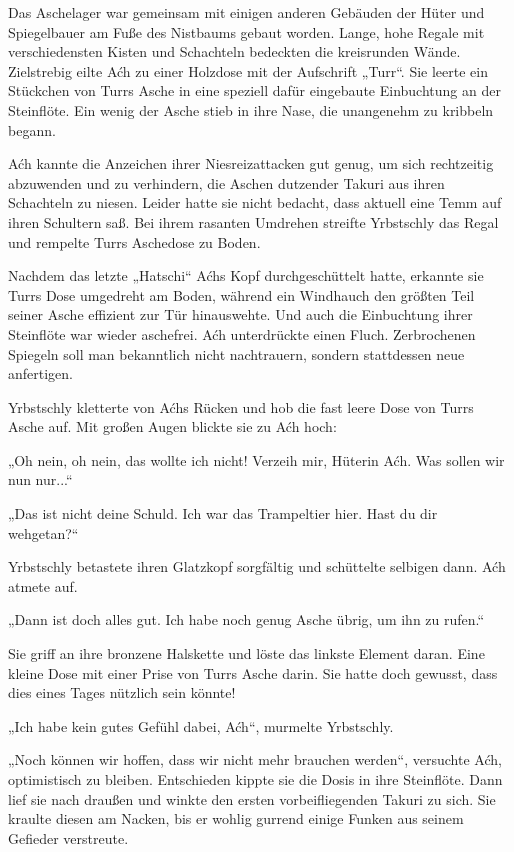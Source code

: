 Das Aschelager war gemeinsam mit einigen anderen Gebäuden der Hüter und Spiegelbauer am Fuße des Nistbaums gebaut worden. Lange, hohe Regale mit verschiedensten Kisten und Schachteln bedeckten die kreisrunden Wände. Zielstrebig eilte Aćh zu einer Holzdose mit der Aufschrift „Turr“. Sie leerte ein Stückchen von Turrs Asche in eine speziell dafür eingebaute Einbuchtung an der Steinflöte. Ein wenig der Asche stieb in ihre Nase, die unangenehm zu kribbeln begann.

Aćh kannte die Anzeichen ihrer Niesreizattacken gut genug, um sich rechtzeitig abzuwenden und zu verhindern, die Aschen dutzender Takuri aus ihren Schachteln zu niesen. Leider hatte sie nicht bedacht, dass aktuell eine Temm auf ihren Schultern saß. Bei ihrem rasanten Umdrehen streifte Yrbstschly das Regal und rempelte Turrs Aschedose zu Boden.

Nachdem das letzte „Hatschi“ Aćhs Kopf durchgeschüttelt hatte, erkannte sie Turrs Dose umgedreht am Boden, während ein Windhauch den größten Teil seiner Asche effizient zur Tür hinauswehte. Und auch die Einbuchtung ihrer Steinflöte war wieder aschefrei. Aćh unterdrückte einen Fluch. Zerbrochenen Spiegeln soll man bekanntlich nicht nachtrauern, sondern stattdessen neue anfertigen.

Yrbstschly kletterte von Aćhs Rücken und hob die fast leere Dose von Turrs Asche auf. Mit großen Augen blickte sie zu Aćh hoch:

„Oh nein, oh nein, das wollte ich nicht! Verzeih mir, Hüterin Aćh. Was sollen wir nun nur...“

„Das ist nicht deine Schuld. Ich war das Trampeltier hier. Hast du dir wehgetan?“

Yrbstschly betastete ihren Glatzkopf sorgfältig und schüttelte selbigen dann. Aćh atmete auf.

„Dann ist doch alles gut. Ich habe noch genug Asche übrig, um ihn zu rufen.“

Sie griff an ihre bronzene Halskette und löste das linkste Element daran. Eine kleine Dose mit einer Prise von Turrs Asche darin. Sie hatte doch gewusst, dass dies eines Tages nützlich sein könnte!

„Ich habe kein gutes Gefühl dabei, Aćh“, murmelte Yrbstschly.

„Noch können wir hoffen, dass wir nicht mehr brauchen werden“, versuchte Aćh, optimistisch zu bleiben. Entschieden kippte sie die Dosis in ihre Steinflöte. Dann lief sie nach draußen und winkte den ersten vorbeifliegenden Takuri zu sich. Sie kraulte diesen am Nacken, bis er wohlig gurrend einige Funken aus seinem Gefieder verstreute.

